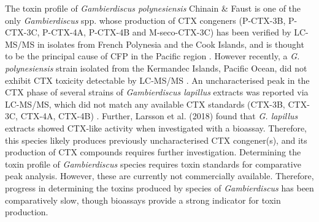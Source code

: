 \documentclass[12pt]{article}
\begin{document}
The toxin profile of \textit{Gambierdiscus polynesiensis} Chinain \& Faust is one of the only \emph{Gambierdiscus} spp.
whose production of CTX congeners (P-CTX-3B, P-CTX-3C, P-CTX-4A, P-CTX-4B and M-seco-CTX-3C) has been verified by LC-MS/MS in isolates from French Polynesia and the Cook Islands, and is thought to be the principal cause of CFP in the Pacific region \citep{chinain2010growth,rhodes2014production}. 
However recently, a \emph{G. polynesiensis} strain isolated from the Kermandec Islands, Pacific Ocean, did not exhibit CTX toxicity detectable by LC-MS/MS  \citep{rhodes2017epiphytic}.
An uncharacterised peak in the CTX phase of several strains of \emph{Gambierdiscus lapillus} extracts was reported via LC-MS/MS, which did not match any available CTX standards (CTX-3B, CTX-3C, CTX-4A, CTX-4B) \citep{kretzschmar2017characterization}. 
Further, Larsson et al. (2018) found that \emph{G. lapillus} extracts showed CTX-like activity when investigated with a bioassay. 
Therefore, this species likely produces previously uncharacterised CTX congener(s), and its production of CTX compounds requires further investigation.
Determining the toxin profile of \textit{Gambierdiscus} species requires toxin standards for comparative peak analysis. 
However, these are currently not commercially available. 
Therefore, progress in determining the toxins produced by species of \emph{Gambierdiscus} has been comparatively slow, though bioassays provide a strong indicator for toxin production.\\

\end{document}
